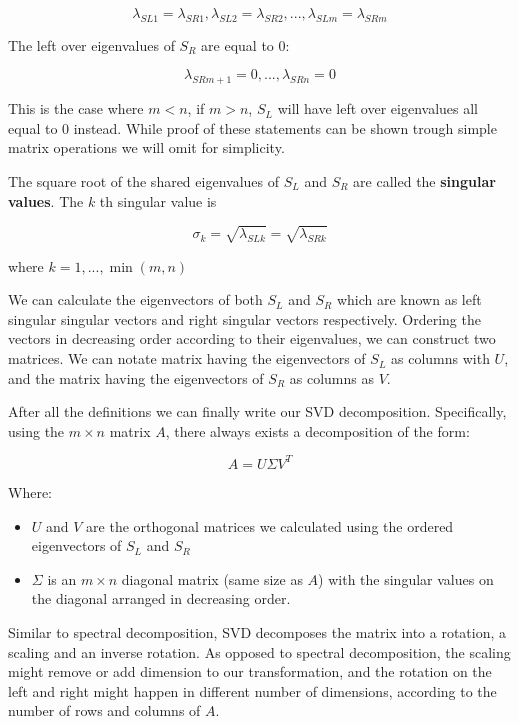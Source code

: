 \[\lambda_{SL1} = \lambda_{SR1}, \lambda_{SL2} = \lambda_{SR2}, ... , \lambda_{SLm} = \lambda_{SRm}\]

The left over eigenvalues of \(S_R\) are equal to \(0\):

\[\lambda_{SRm+1} = 0, ..., \lambda_{SRn} = 0\]

This is the case where \(m < n\), if \(m > n\), \(S_L\) will have left over eigenvalues all equal to \(0\) instead. While proof of these statements can be shown trough simple matrix operations we will omit for simplicity.

The square root of the shared eigenvalues of \(S_L\) and \(S_R\) are called the \textbf{singular values}. The \(k\) th singular value is

\[\sigma_k = \sqrt{\lambda_{SLk}} = \sqrt{\lambda_{SRk}}\]

where \(k = 1,  ..., \min(m, n)\)

We can calculate the eigenvectors of both \(S_L\) and \(S_R\) which are known as left singular singular vectors and right singular vectors respectively. Ordering the vectors in decreasing order according to their eigenvalues, we can construct two matrices. We can notate matrix having the eigenvectors of \(S_L\) as columns with \(U\), and the matrix having the eigenvectors of \(S_R\) as columns as \(V\).

After all the definitions we can finally write our SVD decomposition. Specifically, using the \(m \times n\) matrix \(A\), there always exists a decomposition of the form:

\[A=U\Sigma V^T\]

Where:

\begin{itemize}
    \item \(U\) and \(V\) are the orthogonal matrices we calculated using the ordered eigenvectors of \(S_L\) and \(S_R\)
    \item \(\Sigma\) is an \(m \times n\) diagonal matrix (same size as \(A\)) with the singular values on the diagonal arranged in decreasing order.
\end{itemize}

Similar to spectral decomposition, SVD decomposes the matrix into a rotation, a scaling and an inverse rotation. As opposed to spectral decomposition, the scaling might remove or add dimension to our transformation, and the rotation on the left and right might happen in different number of dimensions, according to the number of rows and columns of \(A\).

